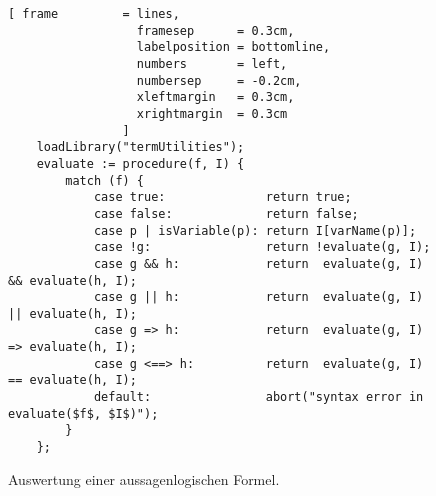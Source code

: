 \begin{figure}[!ht]
  \centering
\begin{Verbatim}[ frame         = lines, 
                  framesep      = 0.3cm, 
                  labelposition = bottomline,
                  numbers       = left,
                  numbersep     = -0.2cm,
                  xleftmargin   = 0.3cm,
                  xrightmargin  = 0.3cm
                ]
    loadLibrary("termUtilities");
    evaluate := procedure(f, I) {
        match (f) {
            case true:              return true;
            case false:             return false;
            case p | isVariable(p): return I[varName(p)];
            case !g:                return !evaluate(g, I);
            case g && h:            return  evaluate(g, I) && evaluate(h, I);
            case g || h:            return  evaluate(g, I) || evaluate(h, I);
            case g => h:            return  evaluate(g, I) => evaluate(h, I);
            case g <==> h:          return  evaluate(g, I) == evaluate(h, I);
            default:                abort("syntax error in evaluate($f$, $I$)");
        }
    };
\end{Verbatim}
\vspace*{-0.3cm}
  \caption{Auswertung einer aussagenlogischen Formel.}
  \label{fig:evaluate.stlx}
\end{figure} 

